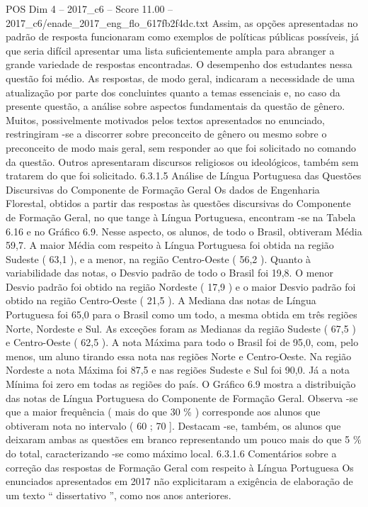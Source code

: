 \begin{textsample}{POS Dim 4 – 2017\_c6 – Score 11.00 – 2017\_c6/enade\_2017\_eng\_flo\_617fb2f4dc.txt}
Assim, as opções apresentadas no padrão de resposta funcionaram como exemplos de políticas públicas possíveis, já que seria difícil apresentar uma lista suficientemente ampla para abranger a grande variedade de respostas encontradas.
O desempenho dos estudantes nessa questão foi médio.
As respostas, de modo geral, indicaram a necessidade de uma atualização por parte dos concluintes quanto a temas essenciais e, no caso da presente questão, a análise sobre aspectos fundamentais da questão de gênero.
Muitos, possivelmente motivados pelos textos apresentados no enunciado, restringiram -se a discorrer sobre preconceito de gênero ou mesmo sobre o preconceito de modo mais geral, sem responder ao que foi solicitado no comando da questão.
Outros apresentaram discursos religiosos ou ideológicos, também sem tratarem do que foi solicitado. 6.3.1.5 Análise de Língua Portuguesa das Questões Discursivas do Componente de Formação Geral Os dados de Engenharia Florestal, obtidos a partir das respostas às questões discursivas do Componente de Formação Geral, no que tange à Língua Portuguesa, encontram -se na Tabela 6.16 e no Gráfico 6.9.
Nesse aspecto, os alunos, de todo o Brasil, obtiveram Média 59,7.
A maior Média com respeito à Língua Portuguesa foi obtida na região Sudeste ( 63,1 ), e a menor, na região Centro-Oeste ( 56,2 ).
Quanto à variabilidade das notas, o Desvio padrão de todo o Brasil foi 19,8.
O menor Desvio padrão foi obtido na região Nordeste ( 17,9 ) e o maior Desvio padrão foi obtido na região Centro-Oeste ( 21,5 ).
A Mediana das notas de Língua Portuguesa foi 65,0 para o Brasil como um todo, a mesma obtida em três regiões Norte, Nordeste e Sul.
As exceções foram as Medianas da região Sudeste ( 67,5 ) e Centro-Oeste ( 62,5 ).
A nota Máxima para todo o Brasil foi de 95,0, com, pelo menos, um aluno tirando essa nota nas regiões Norte e Centro-Oeste.
Na região Nordeste a nota Máxima foi 87,5 e nas regiões Sudeste e Sul foi 90,0.
Já a nota Mínima foi zero em todas as regiões do país.
O Gráfico 6.9 mostra a distribuição das notas de Língua Portuguesa do Componente de Formação Geral.
Observa -se que a maior frequência ( mais do que 30 \% ) corresponde aos alunos que obtiveram nota no intervalo ( 60 ; 70 ].
Destacam -se, também, os alunos que deixaram ambas as questões em branco representando um pouco mais do que 5 \% do total, caracterizando -se como máximo local. 6.3.1.6 Comentários sobre a correção das respostas de Formação Geral com respeito à Língua Portuguesa Os enunciados apresentados em 2017 não explicitaram a exigência de elaboração de um texto “ dissertativo ”, como nos anos anteriores.

\end{textsample}
